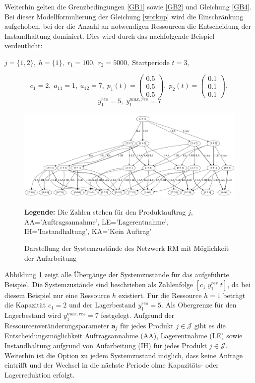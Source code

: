 Weiterhin gelten die Grenzbedingungen \eqref{GB1} sowie \eqref{GB2} und Gleichung \eqref{GB4}. Bei dieser Modellformulierung der Gleichung \eqref{workup} wird die Einschränkung aufgehoben, bei der die Anzahl an notwendigen Ressourcen die Entscheidung der Instandhaltung dominiert. Dies wird durch das nachfolgende Beispiel verdeutlicht:
\begin{center}
$j = \{1, 2\}, \; h = \{1\}, \; r_{1} = 100, \; r_{2} = 5000, \; \text{Startperiode } t=3$,
\end{center}
\[
    c_{1}=2, \;
    a_{11}=1, \;
     a_{12}=7, \;
     p_{1}(t)=\begin{pmatrix} 0.5\\ 0.5\\ 0.5  \end{pmatrix}, \;
     p_{2}(t)=\begin{pmatrix} 0.1\\ 0.1\\ 0.1  \end{pmatrix},
  \]
  \[
    y_{1}^{res}= 5, \;
    y_{1}^{max,res}=7
      \]
\begin{figure}[h!]
  \begin{center}
    \includegraphics[width=130mm]{Bilder/Beispiel5.pdf}
    \caption{Darstellung der Systemzustände des Netzwerk RM mit Möglichkeit der Aufarbeitung}  \label{B5}
    {\footnotesize \textbf{Legende:} Die Zahlen stehen für den Produktauftrag $j$, AA='Auftragsannahme', LE='Lagerentnahme', IH='Instandhaltung', KA='Kein Auftrag'} 
  \end{center}
\end{figure}

Abbildung \ref{B5} zeigt alle Übergänge der Systemzustände für das aufgeführte Beispiel. Die Systemzustände sind beschrieben als Zahlenfolge $[c_{1}\; y_{1}^{res}\;t]$, da bei diesem Beispiel nur eine Ressource $h$ existiert. Für die Ressource $h=1$ beträgt die Kapazität $c_{1}=2$ und der Lagerbestand $y_{1}^{res}=5$. Als Obergrenze für den Lagerbestand wird $y_{1}^{max,res}=7$ festgelegt. Aufgrund der Ressourcenveränderungsparameter $\textbf{a}_{j}$ für jedes Produkt $j\in\mathcal{J}$ gibt es die Entscheidungsmöglichkeit Auftragsannahme (AA), Lagerentnahme (LE) sowie Instandhaltung aufgrund von Aufarbeitung (IH) für jedes Produkt $j\in\mathcal{J}$. Weiterhin ist die Option zu jedem Systemzustand möglich, dass keine Anfrage eintrifft und der Wechsel in die nächste Periode ohne Kapazitäts- oder Lagerreduktion erfolgt.

